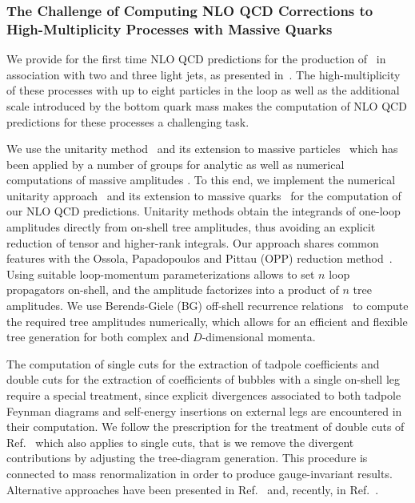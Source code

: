 \subsubsection{The Challenge of Computing NLO QCD Corrections to High-Multiplicity Processes with Massive Quarks}
\label{sec:chall-high-mult}

We provide for the first time NLO QCD predictions for the production of \Wbb~in association with two and
three light jets, as presented in~\cite{wbbpaper}. The high-multiplicity of these processes with up to eight particles in
the loop as well as the additional scale introduced by the
bottom quark mass makes the computation of NLO QCD predictions for
these processes a challenging
task.

 We use the unitarity method~\cite{Bern:1994zx,Bern:1994cg,
Britto:2004nc} and its extension to massive
particles~\cite{Bern:1995db} which has been applied by a number of groups for analytic as well as numerical computations
of massive amplitudes
\cite{Badger:2010mg,Badger:2011yu,Melnikov:2009dn}. To this end, we implement the numerical
unitarity
approach~\cite{Ossola:2006us,Ellis:2007br,Giele:2008ve,Berger:2008sj} and
its extension to massive quarks~\cite{Ellis:2008ir} for the
computation of our NLO QCD predictions. Unitarity methods obtain the integrands of one-loop amplitudes directly from on-shell
tree amplitudes, thus avoiding an explicit reduction of tensor and higher-rank
integrals. Our approach shares common features with the Ossola, Papadopoulos and Pittau (OPP) reduction
method~\cite{Ossola:2006us}. Using suitable
loop-momentum parameterizations allows to set $n$ loop propagators
on-shell, and the amplitude factorizes into a product
of $n$ tree amplitudes. We use Berends-Giele (BG) off-shell
recurrence relations~\cite{Berends:1987me} to compute the required
tree amplitudes numerically, which allows for an
efficient and flexible tree generation for both complex and $D$-dimensional
momenta. 


The computation of single cuts
for the extraction of tadpole coefficients
and double cuts for the extraction of coefficients of bubbles with a single
on-shell leg require a special treatment, since explicit divergences
associated to both tadpole Feynman diagrams and self-energy insertions on external legs
are encountered in their computation. We follow the prescription for
the treatment of double cuts of
Ref.~\cite{Ellis:2008ir} which also applies to single cuts, that is we remove the divergent contributions by adjusting
the tree-diagram generation. This procedure is connected to mass renormalization in order to produce gauge-invariant results. Alternative approaches have been presented in
Ref.~\cite{Britto:2011cr} and, recently, in Ref.~\cite{Badger:2017gta}.


